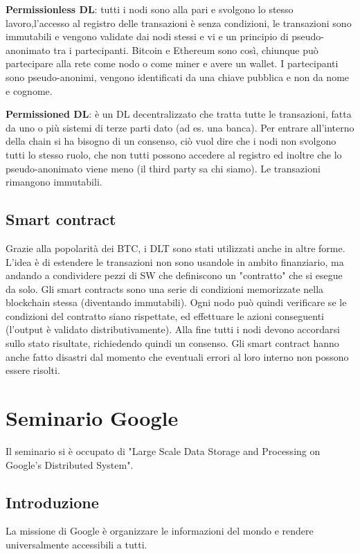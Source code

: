 \documentclass[12pt,italian]{report}
\begin{document}
 \noindent \textbf{Permissionless DL}: tutti i nodi sono alla pari e svolgono lo stesso lavoro,l'accesso al registro delle transazioni è senza condizioni, le transazioni sono immutabili e vengono validate dai nodi stessi e vi e un principio di pseudo-anonimato tra i partecipanti. Bitcoin e Ethereum sono così, chiunque può partecipare alla rete come nodo o come miner e avere un wallet. I partecipanti sono pseudo-anonimi, vengono identificati da una chiave pubblica e non da nome e cognome.
\bigbreak

\noindent \textbf{Permissioned DL}: è un DL decentralizzato che tratta tutte le transazioni, fatta da uno o più sistemi di terze parti dato (ad es. una banca). Per entrare all'interno della chain si ha bisogno di un consenso, ciò vuol dire che i nodi non svolgono tutti lo stesso ruolo, che non tutti possono accedere al registro ed inoltre che lo pseudo-anonimato viene meno (il third party sa chi siamo). Le transazioni rimangono immutabili.

\section{Smart contract}
Grazie alla popolarità dei BTC, i DLT sono stati utilizzati anche in altre forme. L'idea è di estendere le transazioni non sono usandole in ambito finanziario, ma andando a condividere pezzi di SW che definiscono un "contratto" che si esegue da solo. Gli smart contracts sono una serie di condizioni memorizzate nella blockchain stessa (diventando immutabili). Ogni nodo può quindi verificare se le condizioni del contratto siano rispettate, ed effettuare le azioni conseguenti (l'output è validato distributivamente). Alla fine tutti i nodi devono accordarsi sullo stato risultate, richiedendo quindi un consenso. Gli smart contract hanno anche fatto disastri dal momento che eventuali errori al loro interno non possono essere risolti. 

\chapter{Seminario Google}
Il seminario si è occupato di "Large Scale Data Storage and Processing on Google's Distributed System". 

\section{Introduzione}
La missione di Google è organizzare le informazioni del mondo e rendere universalmente accessibili a tutti.
\end{document}
